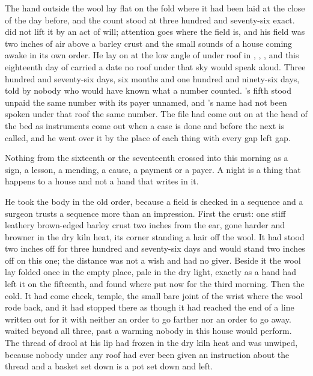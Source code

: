 
The hand outside the wool lay flat on the fold where it had been laid at the close of the day before, and the count stood at three hundred and seventy-six exact.  did not lift it by an act of will; attention goes where the field is, and his field was two inches of air above a barley crust and the small sounds of a house coming awake in its own order. He lay on  at the low angle of  under  roof in , , , and this eighteenth day of  carried a date no roof under that sky would speak aloud. Three hundred and seventy-six days, six months and one hundred and ninety-six days, told by nobody who would have known what a number counted. 's fifth stood unpaid the same number with its payer unnamed, and 's name had not been spoken under that roof the same number. The file had come out on  at the head of the bed as instruments come out when a case is done and before the next is called, and he went over it by the place of each thing with every gap left gap.

Nothing from the sixteenth or the seventeenth crossed into this morning as a sign, a lesson, a mending, a cause, a payment or a payer. A night is a thing that happens to a house and not a hand that writes in it.

He took the body in the old order, because a field is checked in a sequence and a surgeon trusts a sequence more than an impression. First the crust: one stiff leathery brown-edged barley crust two inches from the ear, gone harder and browner in the dry kiln heat, its corner standing a hair off the wool. It had stood two inches off for three hundred and seventy-six days and would stand two inches off on this one; the distance was not a wish and had no giver. Beside it the wool lay folded once in the empty place, pale in the dry light, exactly as a hand had left it on the fifteenth, and found where put now for the third morning. Then the cold. It had come cheek, temple, the small bare joint of the wrist where the wool rode back, and it had stopped there as though it had reached the end of a line written out for it with neither an order to go farther nor an order to go away.  waited beyond all three, past a warming nobody in this house would perform. The thread of drool at his lip had frozen in the dry kiln heat and was unwiped, because nobody under any roof had ever been given an instruction about the thread and a basket set down is a pot set down and left.

